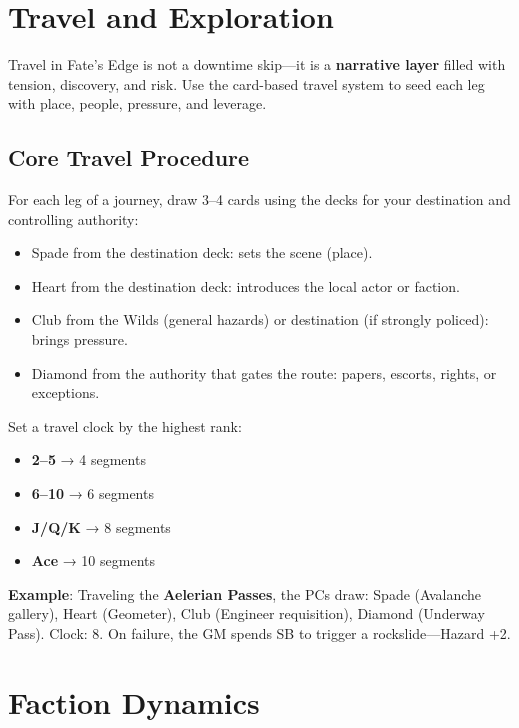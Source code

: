 \section*{Travel and Exploration}

Travel in Fate's Edge is not a downtime skip---it is a \textbf{narrative layer} filled with tension, discovery, and risk. Use the card-based travel system to seed each leg with place, people, pressure, and leverage.

\subsection*{Core Travel Procedure}

For each leg of a journey, draw 3--4 cards using the decks for your destination and controlling authority:

\begin{itemize}
    \item Spade from the destination deck: sets the scene (place).
    \item Heart from the destination deck: introduces the local actor or faction.
    \item Club from the Wilds (general hazards) or destination (if strongly policed): brings pressure.
    \item Diamond from the authority that gates the route: papers, escorts, rights, or exceptions.
\end{itemize}

Set a travel clock by the highest rank:
\begin{itemize}
    \item \textbf{2--5} → 4 segments
    \item \textbf{6--10} → 6 segments
    \item \textbf{J/Q/K} → 8 segments
    \item \textbf{Ace} → 10 segments
\end{itemize}

\textbf{Example}: Traveling the \textbf{Aelerian Passes}, the PCs draw: Spade (Avalanche gallery), Heart (Geometer), Club (Engineer requisition), Diamond (Underway Pass). Clock: 8. On failure, the GM spends SB to trigger a rockslide---Hazard +2.

\section*{Faction Dynamics}

